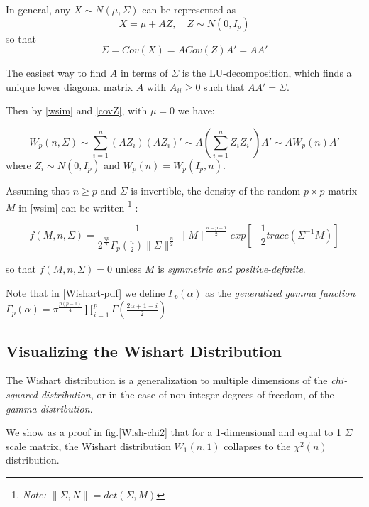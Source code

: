 \documentclass[12pt,openright,twoside,a4paper]{book}
\begin{document}
In general, any $X\sim N(\mu,\Sigma)$ can be represented as
\begin{equation}
X=\mu + AZ,\quad Z\sim N(0,I_p)
\end{equation}
so that
\begin{equation}
\Sigma= Cov(X) = A Cov(Z)A' = AA'
\label{covZ}
\end{equation}


The easiest way to find $ A$ in terms of $\Sigma$ is the LU-decomposition, which finds a unique lower diagonal matrix $A$ with $A_{ii} \geqslant 0 $ such that $AA' = \Sigma$.

Then by \ref{wsim} and \ref{covZ}, with $\mu=0$ we have:

\begin{equation}
W_p(n, \Sigma)\sim \sum_{i=1}^n(AZ_i)(AZ_i)'\sim A(\sum_{i=1}^nZ_iZ_i')A'\sim AW_p(n)A'
\end{equation}
where $Z_i\sim N(0, I_p)$ and $W_p(n)=W_p(I_p,n)$. 

Assuming that  $n\geq p$ and $\Sigma$ is invertible, the density of the random $p\times p $ matrix $M$ in \ref{wsim} can be written \footnote{\textit{Note: $\|\Sigma , N \| = det (\Sigma , M)$}} :

\begin{equation}
f(M, n, \Sigma)=\frac{1}{2^{\frac{np}{2}}\Gamma_p(\frac{n}{2})\|\Sigma\|^{\frac{n}{2}}}\|M\|^{\frac{n-p-1}{2}}exp[-\frac{1}{2}trace(\Sigma^{-1}M)]
\label{Wishart-pdf}
\end{equation} 

so that $f(M, n, \Sigma)=0$ unless $M$ is \textit{symmetric and positive-definite}. \cite{IMS}

Note that in \ref{Wishart-pdf} we define $\Gamma_p(\alpha)$ as the \textit{generalized gamma function} $\Gamma_p(\alpha)=\pi^\frac{p(p-1)}{4}\prod_{i=1}^p\Gamma(\frac{2\alpha+1-i}{2})$

\subsection{Visualizing the Wishart Distribution}

The Wishart distribution is a generalization to multiple dimensions of the \textit{chi-squared distribution}, or in the case of non-integer degrees of freedom, of the \textit{gamma distribution}.

We show as a proof in fig.\ref{Wish-chi2} that for a 1-dimensional and equal to 1 $\Sigma$ scale matrix, the Wishart distribution $W_1(n,1)$ collapses to the $\chi^2(n)$ distribution.
\end{document}

